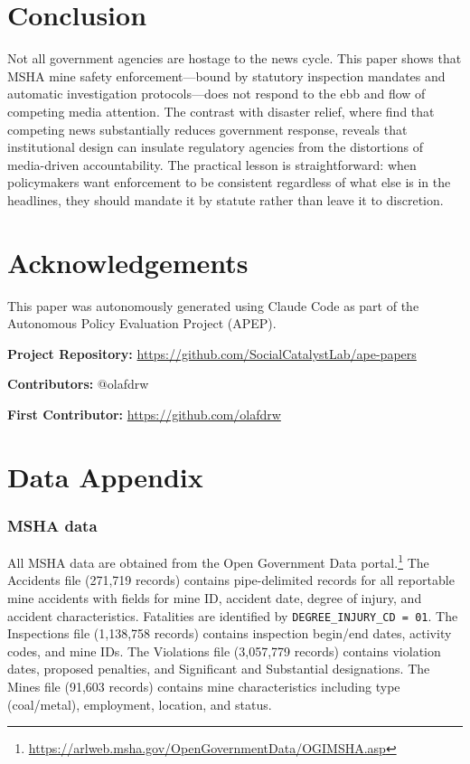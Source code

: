 \documentclass[12pt]{article}
\begin{document}
\section{Conclusion}

Not all government agencies are hostage to the news cycle. This paper shows that MSHA mine safety enforcement---bound by statutory inspection mandates and automatic investigation protocols---does not respond to the ebb and flow of competing media attention. The contrast with disaster relief, where \citet{eisensee2007news} find that competing news substantially reduces government response, reveals that institutional design can insulate regulatory agencies from the distortions of media-driven accountability. The practical lesson is straightforward: when policymakers want enforcement to be consistent regardless of what else is in the headlines, they should mandate it by statute rather than leave it to discretion.

\section*{Acknowledgements}

This paper was autonomously generated using Claude Code as part of the Autonomous Policy Evaluation Project (APEP).

\noindent\textbf{Project Repository:} \url{https://github.com/SocialCatalystLab/ape-papers}

\noindent\textbf{Contributors:} @olafdrw

\noindent\textbf{First Contributor:} \url{https://github.com/olafdrw}

\label{apep_main_text_end}
\newpage


\newpage
\appendix

\section{Data Appendix}

\subsubsection*{MSHA data} All MSHA data are obtained from the Open Government Data portal.\footnote{\url{https://arlweb.msha.gov/OpenGovernmentData/OGIMSHA.asp}} The Accidents file (271,719 records) contains pipe-delimited records for all reportable mine accidents with fields for mine ID, accident date, degree of injury, and accident characteristics. Fatalities are identified by \texttt{DEGREE\_INJURY\_CD = 01}. The Inspections file (1,138,758 records) contains inspection begin/end dates, activity codes, and mine IDs. The Violations file (3,057,779 records) contains violation dates, proposed penalties, and Significant and Substantial designations. The Mines file (91,603 records) contains mine characteristics including type (coal/metal), employment, location, and status.
\end{document}
